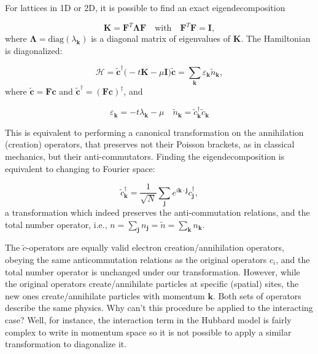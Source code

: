 For lattices in \acs{1D} or \acs{2D}, it is possible to find an exact eigendecomposition

\begin{equation}
\bm K = \bm F^T \bm \Lambda \bm F \quad \text{with}  \quad \bm F^T \bm F = \bm I ,
\end{equation}
where $\bm \Lambda = \text{diag}(\lambda_{\bm k})$ is a diagonal matrix of eigenvalues of $\bm K$.
The Hamiltonian is diagonalized:

\begin{equation}\label{eq:quadraticH}
\mathcal{H} =\tilde{\bm c}^\dagger \big( -t \bm K - \mu \bm I \big) \tilde{\bm c} = \sum_{\bm k} \varepsilon_{\bm k} \tilde{n}_{\bm k} ,
\end{equation}
where $\tilde{\bm c} = \bm F \bm c$ and $\tilde{\bm c}^\dagger = (\bm F \bm c)^\dagger$, and

\begin{equation}
\varepsilon_{\bm k} = -t \lambda_{\bm k} - \mu \quad \tilde{n}_{\bm k} = \tilde{c}_{\bm k}^\dagger \tilde{c}_{\bm k}
\end{equation}

This is equivalent to performing a canonical transformation on the annihilation (creation) operators, that preserves not their Poisson brackets, as in classical mechanics, but their anti-commutators.
Finding the eigendecomposition is equivalent to changing to Fourier space:

\begin{equation}
\tilde{c}_{\bm k}^\dagger = \frac{1}{\sqrt{N}} \sum_{\bm j} e^{i \bm k \cdot \bm j} c_{\bm j}^\dagger ,
\end{equation}
a transformation which indeed preserves the anti-commutation relations, and the total number operator, i.e., $n = \sum_{\bm j} n_{\bm j} = \tilde{n} = \sum_{\bm k} n_{\bm k}$.

The $\tilde{c}$-operators are equally valid electron creation/annihilation operators, obeying the same anticommutation relations as the original operators $c_i$, and the total number operator is unchanged under our transformation.
However, while the original operators create/annihilate particles at specific (spatial) sites, the new ones create/annihilate particles with momentum ${\bm k}$.
Both sets of operators describe the same physics.
Why can't this procedure be applied to the interacting case?
Well, for instance, the interaction term in the Hubbard model is fairly complex to write in momentum space so it is not possible to apply a similar transformation to diagonalize it.

